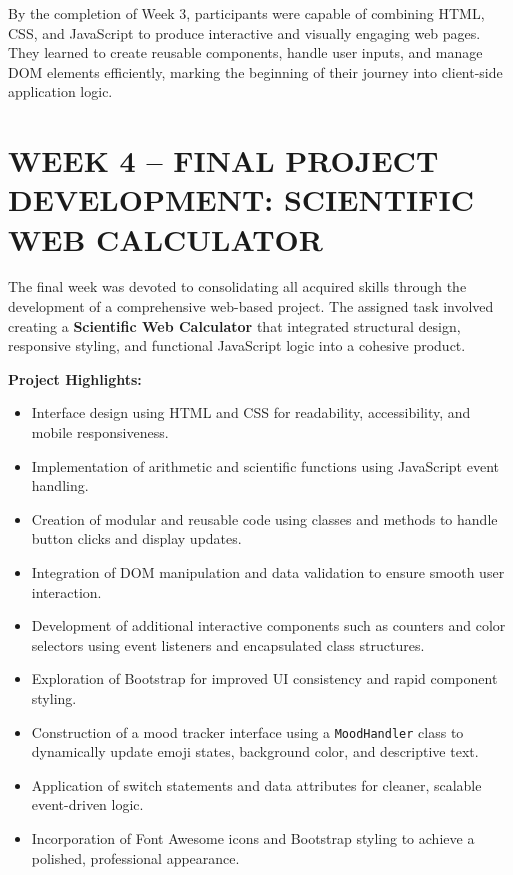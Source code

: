 \documentclass[a4paper,12pt,oneside]{report}
\numberwithin{equation}{chapter}
\numberwithin{figure}{chapter}
\numberwithin{table}{chapter}
\begin{document}
By the completion of Week 3, participants were capable of combining HTML, CSS, and JavaScript to produce interactive and visually engaging web pages. They learned to create reusable components, handle user inputs, and manage DOM elements efficiently, marking the beginning of their journey into client-side application logic.

\vspace{5mm}
\noindent
\section{WEEK 4 – FINAL PROJECT DEVELOPMENT: SCIENTIFIC WEB CALCULATOR}

The final week was devoted to consolidating all acquired skills through the development of a comprehensive web-based project. The assigned task involved creating a \textbf{Scientific Web Calculator} that integrated structural design, responsive styling, and functional JavaScript logic into a cohesive product.

\textbf{Project Highlights:}
\begin{itemize}
    \item Interface design using HTML and CSS for readability, accessibility, and mobile responsiveness.
    \item Implementation of arithmetic and scientific functions using JavaScript event handling.
    \item Creation of modular and reusable code using classes and methods to handle button clicks and display updates.
    \item Integration of DOM manipulation and data validation to ensure smooth user interaction.
    \item Development of additional interactive components such as counters and color selectors using event listeners and encapsulated class structures.
    \item Exploration of Bootstrap for improved UI consistency and rapid component styling.
    \item Construction of a mood tracker interface using a \texttt{MoodHandler} class to dynamically update emoji states, background color, and descriptive text.
    \item Application of switch statements and data attributes for cleaner, scalable event-driven logic.
    \item Incorporation of Font Awesome icons and Bootstrap styling to achieve a polished, professional appearance.
\end{itemize}
\end{document}
